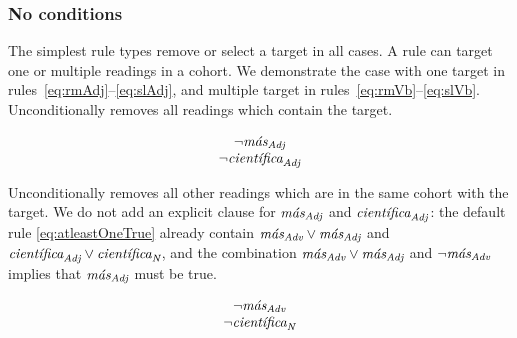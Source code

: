 \subsubsection{No conditions} 

The simplest rule types remove or select a target in all cases. 
A rule can target one or multiple readings in a cohort. We demonstrate the case with one target in rules~\ref{eq:rmAdj}--\ref{eq:slAdj}, and multiple target in rules~\ref{eq:rmVb}--\ref{eq:slVb}. \\


 Unconditionally removes all readings which contain the target.

\begin{equation}
\begin{array}{c}
\neg{}\masAdj \\
\neg{}\cientificaAdj
\end{array}
\label{eq:rmAdj}
\end{equation}

 Unconditionally removes all other readings which are in the same cohort with the target.
We do not add an explicit clause for $\text{\em m\'{a}s}_{\text{\em Adj}}$ and $\cientificaAdj$: the default rule \ref{eq:atleastOneTrue} already contain $\text{\em m\'{a}s}_{\text{\em Adv}} \vee \text{\em m\'{a}s}_{\text{\em Adj}}$ and $\cientificaAdj \vee \cientificaN$, and the combination $\text{\em m\'{a}s}_{\text{\em Adv}} \vee \text{\em m\'{a}s}_{\text{\em Adj}}$ and $\neg\text{\em m\'{a}s}_{\text{\em Adv}}$ implies that $\text{\em m\'{a}s}_{\text{\em Adj}}$ must be true. 

\begin{equation}
\begin{array}{c}
\neg{}\masAdv \\
\neg{}\cientificaN
\end{array}
\label{eq:slAdj}
\end{equation}





